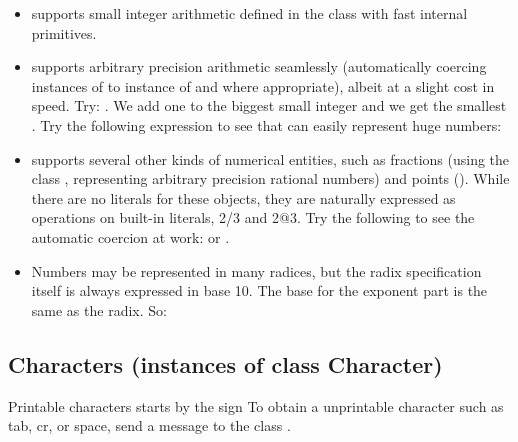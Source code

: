 \documentclass[a4paper,10pt,twoside]{book}
\begin{document}
\begin{itemize}
\item \sq supports small integer arithmetic defined in the class  with fast internal primitives.

\item \sq supports arbitrary precision arithmetic seamlessly (automatically coercing instances of  to instance of  and  where appropriate), albeit at a slight cost in speed. Try: . We add one to the biggest small integer and we get the smallest . Try the following expression to see that \sq can easily represent huge numbers: 

\item \sq supports several other kinds of numerical entities, such as fractions (using the class , representing arbitrary precision rational numbers) and points (). While there are no literals for these objects, they are naturally expressed as operations on built-in literals, \eg{} 2/3 and 2@3. Try the following to see the automatic coercion at work:   or .

\item Numbers may be represented in many radices, but the radix specification itself is always expressed in base 10.
The base for the exponent part is the same as the radix. So:

\end{itemize}




\subsection{Characters (instances of class Character)}
Printable characters starts by the sign %
To obtain a unprintable character
such as tab, cr, or space, send a message to the class .
\end{document}
